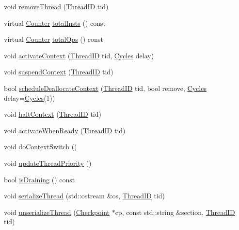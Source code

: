 \begin{DoxyCompactItemize}
void \hyperlink{classFullO3CPU_a5fd824111bd328c70c3060d121ac5d49}{removeThread} (\hyperlink{base_2types_8hh_ab39b1a4f9dad884694c7a74ed69e6a6b}{ThreadID} tid)
\item 
virtual \hyperlink{base_2types_8hh_ae1475755791765b8e6f6a8bb091e273e}{Counter} \hyperlink{classFullO3CPU_a7e01d94bb5a6e15fa8c94bcdf276115d}{totalInsts} () const 
\item 
virtual \hyperlink{base_2types_8hh_ae1475755791765b8e6f6a8bb091e273e}{Counter} \hyperlink{classFullO3CPU_a76fa5df6827aaa8fc26deebad97d9e78}{totalOps} () const 
\item 
void \hyperlink{classFullO3CPU_aadedce642b14c1bde1b3281767df99d4}{activateContext} (\hyperlink{base_2types_8hh_ab39b1a4f9dad884694c7a74ed69e6a6b}{ThreadID} tid, \hyperlink{classCycles}{Cycles} delay)
\item 
void \hyperlink{classFullO3CPU_aed2e2b9af515a66bdde61b85f150856a}{suspendContext} (\hyperlink{base_2types_8hh_ab39b1a4f9dad884694c7a74ed69e6a6b}{ThreadID} tid)
\item 
bool \hyperlink{classFullO3CPU_a64179a936408228ff1718afd541e230b}{scheduleDeallocateContext} (\hyperlink{base_2types_8hh_ab39b1a4f9dad884694c7a74ed69e6a6b}{ThreadID} tid, bool remove, \hyperlink{classCycles}{Cycles} delay=\hyperlink{classCycles}{Cycles}(1))
\item 
void \hyperlink{classFullO3CPU_ac2156e0955d5e1ef6e06cd0e2ab218e4}{haltContext} (\hyperlink{base_2types_8hh_ab39b1a4f9dad884694c7a74ed69e6a6b}{ThreadID} tid)
\item 
void \hyperlink{classFullO3CPU_a47befc2af24481200005f0b9cffab093}{activateWhenReady} (\hyperlink{base_2types_8hh_ab39b1a4f9dad884694c7a74ed69e6a6b}{ThreadID} tid)
\item 
void \hyperlink{classFullO3CPU_aa44d4f535cfaf67b335cab7e390a9257}{doContextSwitch} ()
\item 
void \hyperlink{classFullO3CPU_a00247488696e6ff608a2a44673578094}{updateThreadPriority} ()
\item 
bool \hyperlink{classFullO3CPU_a8256d21571cb453f728d6b85e6fc6d15}{isDraining} () const 
\item 
void \hyperlink{classFullO3CPU_a688ca491f5419c29fb81f8235ba1dc13}{serializeThread} (std::ostream \&os, \hyperlink{base_2types_8hh_ab39b1a4f9dad884694c7a74ed69e6a6b}{ThreadID} tid)
\item 
void \hyperlink{classFullO3CPU_a5122e6d6fdbdb3cb9ba72ae970f00a9e}{unserializeThread} (\hyperlink{classCheckpoint}{Checkpoint} $\ast$cp, const std::string \&section, \hyperlink{base_2types_8hh_ab39b1a4f9dad884694c7a74ed69e6a6b}{ThreadID} tid)

\end{DoxyCompactItemize}
